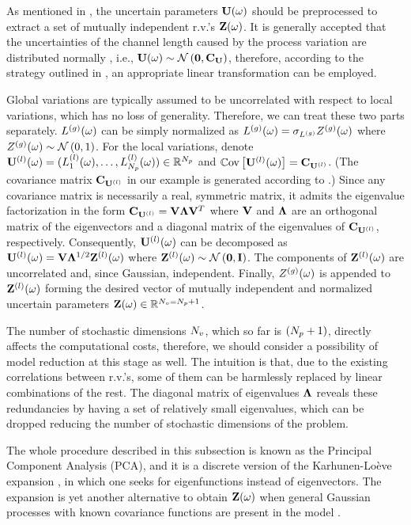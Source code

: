As mentioned in , the uncertain parameters $\mathbf{U}(\omega)$ should be preprocessed to extract a set of mutually independent r.v.'s $\mathbf{Z}(\omega)$. It is generally accepted that the uncertainties of the channel length caused by the process variation are distributed normally \cite{srivastava2010, liu2007, juan2012}, i.e., $\vU(\o) \sim \normal{\vZero}{\mCov_\vU}$, therefore, according to the strategy outlined in , an appropriate linear transformation can be employed.

Global variations are typically assumed to be uncorrelated with respect to local variations, which has no loss of generality. Therefore, we can treat these two parts separately. ${L^{(g)}}(\omega)$ can be simply normalized as ${L^{(g)}}(\omega) = \sigma_{L^{(g)}} {Z^{(g)}}(\omega)$ where ${Z^{(g)}}(\omega) \sim \mathcal{N}\left( 0, 1 \right)$. For the local variations, denote ${\mathbf{U}^{(l)}}(\omega) = (L^{(l)}_1(\omega), \dotsc, L^{(l)}_{N_p}(\omega)) \in \mathbb{R}^{N_p}$ and $\oCov{\vlLeff(\o)} = \mCov_\vlLeff$. (The covariance matrix $\mCov_\vlLeff$ in our example is generated according to .) Since any covariance matrix is necessarily a real, symmetric matrix, it admits the eigenvalue factorization \cite{press2007} in the form $\mCov_\vlLeff = \m{V} \m{\Lambda} \m{V}^T$ where $\m{V}$ and $\m{\Lambda}$ are an orthogonal matrix of the eigenvectors and a diagonal matrix of the eigenvalues of $\mCov_\vlLeff$, respectively. Consequently, ${\mathbf{U}^{(l)}}(\omega)$ can be decomposed as $\vlLeff(\o) = \m{V} \m{\Lambda}^\ifrac{1}{2} \vlZ(\o)$ where $\vlZ(\o) \sim \normal{\vZero}{\mI}$. The components of ${\mathbf{Z}^{(l)}}(\omega)$ are uncorrelated and, since Gaussian, independent. Finally, ${Z^{(g)}}(\omega)$ is appended to ${\mathbf{Z}^{(l)}}(\omega)$ forming the desired vector of mutually independent and normalized uncertain parameters $\mathbf{Z}(\omega) \in \mathbb{R}^{{N_v} = {N_p} + 1}$.

The number of stochastic dimensions ${N_v}$, which so far is $({N_p} + 1)$, directly affects the computational costs, therefore, we should consider a possibility of model reduction at this stage as well. The intuition is that, due to the existing correlations between r.v.'s, some of them can be harmlessly replaced by linear combinations of the rest. The diagonal matrix of eigenvalues $\m{\Lambda}$ reveals these redundancies by having a set of relatively small eigenvalues, which can be dropped reducing the number of stochastic dimensions of the problem.

The whole procedure described in this subsection is known as the Principal Component Analysis (PCA), and it is a discrete version of the Karhunen-Lo\`{e}ve expansion \cite{loeve1978}, in which one seeks for eigenfunctions instead of eigenvectors. The expansion is yet another alternative to obtain $\mathbf{Z}(\omega)$ when general Gaussian processes with known covariance functions are present in the model \cite{xiu2010}.
